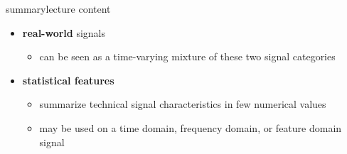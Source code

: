 \begin{frame}{summary}{lecture content}
\begin{itemize}
\begin{itemize}
                    \end{itemize}
                \smallskip
                \item   \textbf{real-world} signals
                    \begin{itemize}
                        \item   can be seen as a time-varying mixture of these two signal categories
                    \end{itemize}
               \smallskip
               \item   \textbf{statistical features}  
                    \begin{itemize}
                        \item  summarize technical signal characteristics in few numerical values 
                        \item   may be used on a time domain, frequency domain, or feature domain signal
                    \end{itemize}
            \end{itemize}
        \end{frame}

